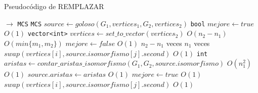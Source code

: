 \begin{algorithm}[H]
  \small
  \begin{algorithmic}[1]
  \caption{Pseudocódigo de REMPLAZAR}
  \label{algo:1-1}
    $\rightarrow$ \texttt{MCS}
      \State \texttt{MCS} $source \gets goloso(G_1, vertices_1, G_2, vertices_2)$
      \State \texttt{bool} $mejore \gets true$
      \Comment $O(1)$
      \State \texttt{vector<int>} $vertices \gets set\_to\_vector(vertices_2)$
      \Comment $O(n_2-n_1)$
      \Comment $O(min\{m_1, m_2\})$
        \State $mejore \gets false$
        \Comment $O(1)$
        \Comment $n_2-n_1$ veces
          \Comment $n_1$ veces
            \State $swap(vertices[i], source.isomorfismo[j].second)$
            \Comment $O(1)$
            \State \texttt{int} $aristas \gets contar\_aristas\_isomorfismo(G_1, G_2, source.isomorfismo)$
            \Comment $O(n_1^2)$
            \Comment $O(1)$
              \State $source.aristas \gets aristas$  
              \Comment $O(1)$            
              \State $mejore \gets true$
              \Comment $O(1)$
            \Else
              \State $swap(vertices[i], source.isomorfismo[j].second)$
              \Comment $O(1)$
            \EndIf
          \EndFor
        \EndFor
      \EndWhile
    \EndProcedure
  \end{algorithmic}
\end{algorithm}

